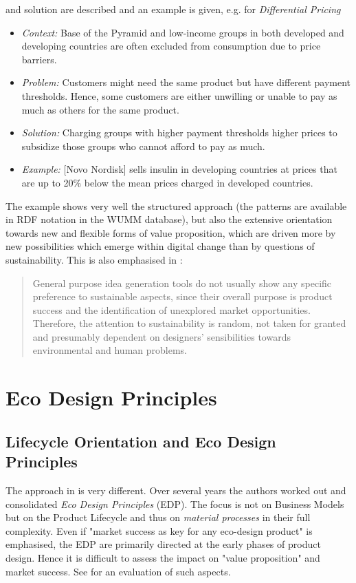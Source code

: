 \documentclass[11pt,a4paper]{article}
\begin{document}
and solution are described and an example is given, e.g. for
\emph{Differential Pricing}
\begin{itemize}
\item \emph{Context:} Base of the Pyramid and low-income groups in both
  developed and developing countries are often excluded from consumption due
  to price barriers.
\item \emph{Problem:} Customers might need the same product but have different
  payment thresholds. Hence, some customers are either unwilling or unable to
  pay as much as others for the same product.
\item \emph{Solution:} Charging groups with higher payment thresholds higher
  prices to subsidize those groups who cannot afford to pay as much.
\item \emph{Example:} [Novo Nordisk] sells insulin in developing countries at
  prices that are up to 20\% below the mean prices charged in developed
  countries.
\end{itemize}

The example shows very well the structured approach (the patterns are
available in RDF notation in the WUMM database), but also the extensive
orientation towards new and flexible forms of value proposition, which are
driven more by new possibilities which emerge within digital change than by
questions of sustainability.  This is also emphasised in
\cite[p. 3]{Russo2020}:
\begin{quote}
  General purpose idea generation tools do not usually show any specific
  preference to sustainable aspects, since their overall purpose is product
  success and the identification of unexplored market opportunities.
  Therefore, the attention to sustainability is random, not taken for granted
  and presumably dependent on designers’ sensibilities towards environmental
  and human problems.
\end{quote}

\section{Eco Design Principles}

\subsection{Lifecycle Orientation and Eco Design Principles}

The approach in \cite{Russo2020} is very different.  Over several years the
authors worked out and consolidated \emph{Eco Design Principles} (EDP).  The
focus is not on Business Models but on the Product Lifecycle and thus on
\emph{material processes} in their full complexity. Even if "market success as
key for any eco-design product" \cite[p. 1]{Maccioni2019} is emphasised, the
EDP are primarily directed at the early phases of product design.  Hence it is
difficult to assess the impact on "value proposition" and market success.  See
\cite{Maccioni2019} for an evaluation of such aspects.
\end{document}
